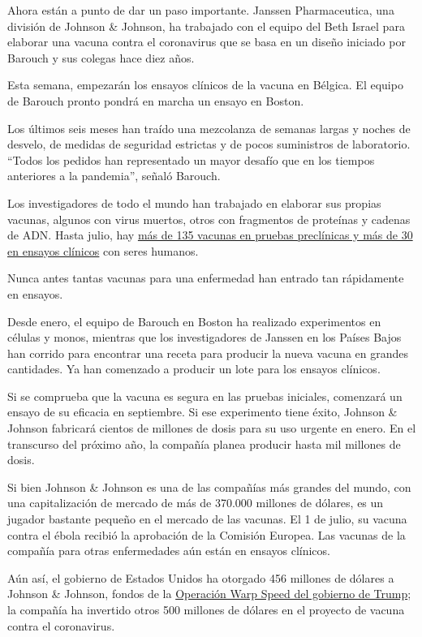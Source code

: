 Ahora están a punto de dar un paso importante. Janssen Pharmaceutica,
una división de Johnson \& Johnson, ha trabajado con el equipo del Beth
Israel para elaborar una vacuna contra el coronavirus que se basa en un
diseño iniciado por Barouch y sus colegas hace diez años.

Esta semana, empezarán los ensayos clínicos de la vacuna en Bélgica. El
equipo de Barouch pronto pondrá en marcha un ensayo en Boston.

Los últimos seis meses han traído una mezcolanza de semanas largas y
noches de desvelo, de medidas de seguridad estrictas y de pocos
suministros de laboratorio. ``Todos los pedidos han representado un
mayor desafío que en los tiempos anteriores a la pandemia'', señaló
Barouch.

Los investigadores de todo el mundo han trabajado en elaborar sus
propias vacunas, algunos con virus muertos, otros con fragmentos de
proteínas y cadenas de ADN. Hasta julio, hay
\href{https://www.nytimes.com/interactive/2020/science/coronavirus-vaccine-tracker.html}{más
de 135 vacunas en pruebas preclínicas y más de 30 en ensayos clínicos}
con seres humanos.

Nunca antes tantas vacunas para una enfermedad han entrado tan
rápidamente en ensayos.

Desde enero, el equipo de Barouch en Boston ha realizado experimentos en
células y monos, mientras que los investigadores de Janssen en los
Países Bajos han corrido para encontrar una receta para producir la
nueva vacuna en grandes cantidades. Ya han comenzado a producir un lote
para los ensayos clínicos.

Si se comprueba que la vacuna es segura en las pruebas iniciales,
comenzará un ensayo de su eficacia en septiembre. Si ese experimento
tiene éxito, Johnson \& Johnson fabricará cientos de millones de dosis
para su uso urgente en enero. En el transcurso del próximo año, la
compañía planea producir hasta mil millones de dosis.

Si bien Johnson \& Johnson es una de las compañías más grandes del
mundo, con una capitalización de mercado de más de 370.000 millones de
dólares, es un jugador bastante pequeño en el mercado de las vacunas. El
1 de julio, su vacuna contra el ébola recibió la aprobación de la
Comisión Europea. Las vacunas de la compañía para otras enfermedades aún
están en ensayos clínicos.

Aún así, el gobierno de Estados Unidos ha otorgado 456 millones de
dólares a Johnson \& Johnson, fondos de la
\href{https://www.hhs.gov/about/news/2020/06/16/fact-sheet-explaining-operation-warp-speed.html}{Operación
Warp Speed del gobierno de Trump}; la compañía ha invertido otros 500
millones de dólares en el proyecto de vacuna contra el coronavirus.

